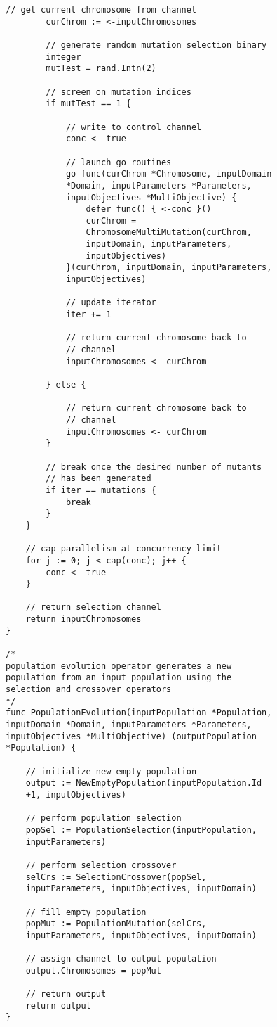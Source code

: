 \begin{lstlisting}[basicstyle=\small]
		// get current chromosome from channel
		curChrom := <-inputChromosomes

		// generate random mutation selection binary 
		integer
		mutTest = rand.Intn(2)

		// screen on mutation indices
		if mutTest == 1 {

			// write to control channel
			conc <- true

			// launch go routines
			go func(curChrom *Chromosome, inputDomain 
			*Domain, inputParameters *Parameters, 
			inputObjectives *MultiObjective) {
				defer func() { <-conc }()
				curChrom = 
				ChromosomeMultiMutation(curChrom, 
				inputDomain, inputParameters, 
				inputObjectives)
			}(curChrom, inputDomain, inputParameters, 
			inputObjectives)

			// update iterator
			iter += 1

			// return current chromosome back to 
			// channel
			inputChromosomes <- curChrom

		} else {

			// return current chromosome back to 
			// channel
			inputChromosomes <- curChrom
		}

		// break once the desired number of mutants 
		// has been generated
		if iter == mutations {
			break
		}
	}

	// cap parallelism at concurrency limit
	for j := 0; j < cap(conc); j++ {
		conc <- true
	}

	// return selection channel
	return inputChromosomes
}

/* 
population evolution operator generates a new 
population from an input population using the 
selection and crossover operators
*/
func PopulationEvolution(inputPopulation *Population, 
inputDomain *Domain, inputParameters *Parameters, 
inputObjectives *MultiObjective) (outputPopulation 
*Population) {

	// initialize new empty population
	output := NewEmptyPopulation(inputPopulation.Id
	+1, inputObjectives)

	// perform population selection
	popSel := PopulationSelection(inputPopulation, 
	inputParameters)

	// perform selection crossover
	selCrs := SelectionCrossover(popSel, 
	inputParameters, inputObjectives, inputDomain)

	// fill empty population
	popMut := PopulationMutation(selCrs, 
	inputParameters, inputObjectives, inputDomain)

	// assign channel to output population
	output.Chromosomes = popMut

	// return output
	return output
}

\end{lstlisting}

